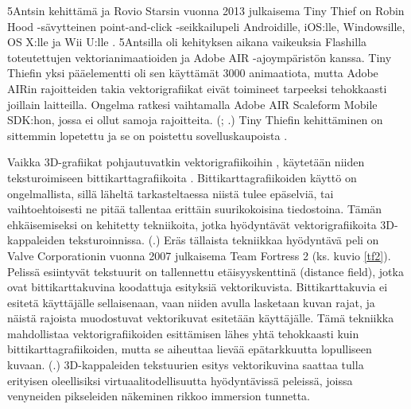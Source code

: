 \documentclass[utf8,bachelor]{gradu3}
\newcommand{\parencitedot}[1]{(\cite{#1}.)}
\newcommand{\parencitesdot}[2]{(\cite{#1}; \cite{#2}.)}
\begin{document}
5Antsin kehittämä ja Rovio Starsin vuonna 2013 julkaisema Tiny Thief on Robin Hood -sävytteinen point-and-click -seikkailupeli Androidille, iOS:lle, Windowsille, OS X:lle ja Wii U:lle \parencites{RefWorks:doc:5bf09463e4b06df665225aeb}{RefWorks:doc:5bf0993ae4b0e21eda418a20}{RefWorks:doc:5bf099d4e4b08f3b86fd2aa3}. 5Antsilla oli kehityksen aikana vaikeuksia Flashilla toteutettujen vektorianimaatioiden ja Adobe AIR -ajoympäristön kanssa. Tiny Thiefin yksi pääelementti oli sen käyttämät 3000 animaatiota, mutta Adobe AIRin rajoitteiden takia vektorigrafiikat eivät toimineet tarpeeksi tehokkaasti joillain laitteilla. Ongelma ratkesi vaihtamalla Adobe AIR Scaleform Mobile SDK:hon, jossa ei ollut samoja rajoitteita. \parencitesdot{RefWorks:doc:5bf09463e4b06df665225aeb}{RefWorks:doc:5bf093b3e4b093d9850ad715} Tiny Thiefin kehittäminen on sittemmin lopetettu ja se on poistettu sovelluskaupoista \parencite{RefWorks:doc:5bf0a115e4b09867bf4e3edb}.

Vaikka 3D-grafiikat pohjautuvatkin vektorigrafiikoihin \parencite{RefWorks:doc:5bdc5224e4b05afcfde5b159}, käytetään niiden teksturoimiseen bittikarttagrafiikoita \parencite{RefWorks:doc:5bf00b76e4b0b28cc7291a34}. Bittikarttagrafiikoiden käyttö on ongelmallista, sillä läheltä tarkasteltaessa niistä tulee epäselviä, tai vaihtoehtoisesti ne pitää tallentaa erittäin suurikokoisina tiedostoina. Tämän ehkäisemiseksi on kehitetty tekniikoita, jotka hyödyntävät vektorigrafiikoita 3D-kappaleiden teksturoinnissa. \parencitedot{RefWorks:doc:5bc4a5cbe4b0af09f17dfdc1} Eräs tällaista tekniikkaa hyödyntävä peli on Valve Corporationin vuonna 2007 julkaisema Team Fortress 2 (ks. kuvio \ref{tf2}). Pelissä esiintyvät tekstuurit on tallennettu etäisyyskenttinä (distance field), jotka ovat bittikarttakuvina koodattuja esityksiä vektorikuvista. Bittikarttakuvia ei esitetä käyttäjälle sellaisenaan, vaan niiden avulla lasketaan kuvan rajat, ja näistä rajoista muodostuvat vektorikuvat esitetään käyttäjälle. Tämä tekniikka mahdollistaa vektorigrafiikoiden esittämisen lähes yhtä tehokkaasti kuin bittikarttagrafiikoiden, mutta se aiheuttaa lievää epätarkkuutta lopulliseen kuvaan. \parencitedot{RefWorks:doc:5bc4a5cbe4b0af09f17dfdc1} 3D-kappaleiden tekstuurien esitys vektorikuvina saattaa tulla erityisen oleellisiksi virtuaalitodellisuutta hyödyntävissä peleissä, joissa venyneiden pikseleiden näkeminen rikkoo immersion tunnetta.
\end{document}
